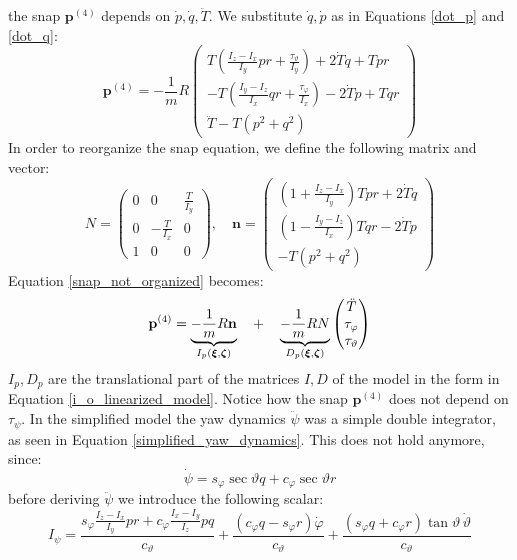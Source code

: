 \documentclass[10pt, a4paper]{report}
\begin{document}
the snap $\mathbf p^{(4)}$ depends on $\dot p,\dot q,\ddot T$. We substitute $\dot q,\dot p$ as in Equations \eqref{dot_p} and \eqref{dot_q}:\begin{equation}\label{snap_not_organized}
    \mathbf p^{(4)}=-\frac{1}{m}R\begin{pmatrix}
        T(\frac{I_z - I_x}{I_y} p r + \frac{\tau_\vartheta}{I_y})+2\dot T q+ Tpr\\ 
        -T( \frac{I_y - I_z}{I_x} q r + \frac{\tau_\varphi}{I_x})-2\dot Tp+Tqr\\ 
        \ddot T-T(p^2+q^2)
    \end{pmatrix}
\end{equation}
In order to reorganize the snap equation, we define the following matrix and vector:\begin{equation}
    N=\begin{pmatrix}
        0&0&\frac{T}{I_y}\\
        0&-\frac{T}{I_x}&0\\
        1&0&0
    \end{pmatrix},\quad 
    \mathbf n=\begin{pmatrix}
        (1+\frac{I_z-I_x}{I_y})Tpr+2\dot Tq\\ 
        (1-\frac{I_y-I_z}{I_x})Tqr-2\dot Tp\\ 
        -T(p^2+q^2)
    \end{pmatrix}
\end{equation}
Equation \eqref{snap_not_organized} becomes:\begin{equation}
    \mathbf p^{(4)}=
    \underbrace{-\frac{1}{m}R\mathbf n}_{I_p({\boldsymbol{\xi}},{\boldsymbol{\zeta}})}\quad + \quad
    \underbrace{-\frac{1}{m}RN}_{D_p({\boldsymbol{\xi}},{\boldsymbol{\zeta}})}
    \begin{pmatrix}
        \ddot T\\\tau_\varphi\\\tau_\vartheta
    \end{pmatrix}
\end{equation}
$I_p,D_p$ are the translational part of the matrices $I,D$ of the model in the form in Equation \eqref{i_o_linearized_model}. Notice how the snap $\mathbf p^{(4)}$ does not depend on $\tau_\psi$. In the simplified model the yaw dynamics $\ddot\psi$ was a simple double integrator, as seen in Equation \eqref{simplified_yaw_dynamics}. This does not hold anymore, since:\begin{equation}
    \dot{\psi} = s_\varphi \sec\vartheta q + c_\varphi \sec\vartheta r
\end{equation}
before deriving $\ddot\psi$ we introduce the following scalar:\begin{equation}
   I_{\psi} = \frac{s_{\varphi} \frac{I_z-I_x}{I_y} p r + c_{\varphi} \frac{I_x-I_y}{I_z} p q}{c_{\vartheta}} + \frac{(c_{\varphi} q - s_{\varphi} r)\dot{\varphi}}{c_{\vartheta}} + \frac{(s_{\varphi} q + c_{\varphi} r) \tan \vartheta \, \dot{\vartheta}}{c_{\vartheta}}
\end{equation}
\end{document}
